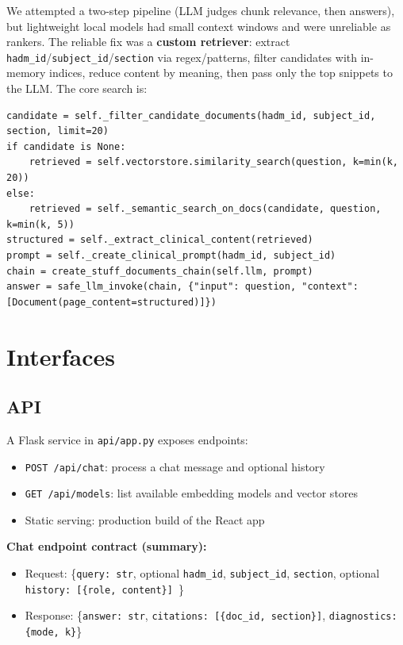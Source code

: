 We attempted a two-step pipeline (LLM judges chunk relevance, then answers), but lightweight local models had small context windows and were unreliable as rankers. The reliable fix was a \textbf{custom retriever}: extract \texttt{hadm\_id}/\break\texttt{subject\_id}/\texttt{section} via regex/patterns, filter candidates with in-memory indices, reduce content by meaning, then pass only the top snippets to the LLM. The core search is:
\begin{verbatim}
candidate = self._filter_candidate_documents(hadm_id, subject_id, section, limit=20)
if candidate is None:
    retrieved = self.vectorstore.similarity_search(question, k=min(k, 20))
else:
    retrieved = self._semantic_search_on_docs(candidate, question, k=min(k, 5))
structured = self._extract_clinical_content(retrieved)
prompt = self._create_clinical_prompt(hadm_id, subject_id)
chain = create_stuff_documents_chain(self.llm, prompt)
answer = safe_llm_invoke(chain, {"input": question, "context": [Document(page_content=structured)]})
\end{verbatim}

\newpage
\section{Interfaces}

\subsection{API}
A Flask service in \texttt{api/app.py} exposes endpoints:
\begin{itemize}
  \item \texttt{POST /api/chat}: process a chat message and optional history
  \item \texttt{GET /api/models}: list available embedding models and vector stores
  \item Static serving: production build of the React app
\end{itemize}

\noindent \textbf{Chat endpoint contract (summary):}
\begin{itemize}
  \item Request: \{\texttt{query: str}, optional \texttt{hadm\_id}, \texttt{subject\_id}, \break\texttt{section}, optional \texttt{history: [\{role, content\}] }\}
  \item Response: \{\texttt{answer: str}, \texttt{citations: [\{doc\_id, section\}]}, \break\texttt{diagnostics: \{mode, k\}}\}
\end{itemize}

